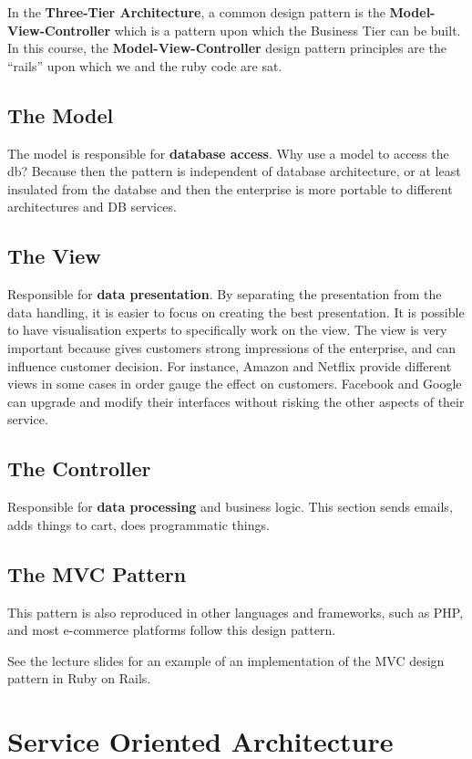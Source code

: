 \documentclass[11pt]{article}
\begin{document}
In the \textbf{Three-Tier Architecture}, a common design pattern is the \textbf{Model-View-Controller} which is a pattern upon which the Business Tier can be built. In this course, the \textbf{Model-View-Controller} design pattern principles are the ``rails'' upon which we and the ruby code are sat.

\subsection{The Model}
The model is responsible for \textbf{database access}. Why use a model to access the db? Because then the pattern is independent of database architecture, or at least insulated from the databse and then the enterprise is more portable to different architectures and DB services.

\subsection{The View}
Responsible for \textbf{data presentation}. By separating the presentation from the data handling, it is easier to focus on creating the best presentation. It is possible to have visualisation experts to specifically work on the view. The view is very important because gives customers strong impressions of the enterprise, and can influence customer decision. For instance, Amazon and Netflix provide different views in some cases in order gauge the effect on customers. Facebook and Google can upgrade and modify their interfaces without risking the other aspects of their service.

\subsection{The Controller}
Responsible for \textbf{data processing} and business logic. This section sends emails, adds things to cart, does programmatic things.

\subsection{The MVC Pattern}
This pattern is also reproduced in other languages and frameworks, such as PHP, and most e-commerce platforms follow this design pattern.

See the lecture slides for an example of an implementation of the MVC design pattern in Ruby on Rails.


\section{Service Oriented Architecture}
\label{sec:SOA}
\end{document}
